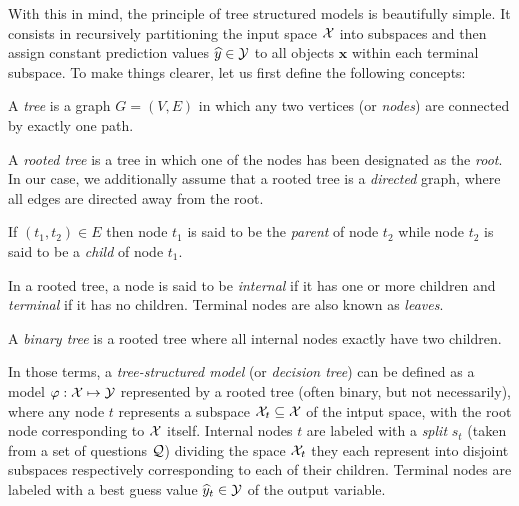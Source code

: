 With this in mind, the principle of tree structured models is beautifully
simple. It consists in recursively partitioning the input space ${\cal X}$ into
subspaces and then assign constant prediction values $\widehat{y}\in{\cal Y}$ to all objects
$\mathbf{x}$ within each terminal subspace. To make things clearer, let us first define
the following concepts:

\begin{definition}
A \emph{tree} is a graph $G=(V,E)$ in which any two vertices (or \emph{nodes})
are connected by exactly one path.
\end{definition}

\begin{definition}
A \emph{rooted tree} is a tree in which one of the nodes has been designated as
the \emph{root}. In our case, we additionally assume that a rooted tree is a
\emph{directed} graph, where all edges are directed away from the root.
\end{definition}

\begin{definition}
If $(t_1, t_2)\in E$ then node $t_1$ is said to be the \emph{parent} of
node $t_2$ while node $t_2$ is said to be a \emph{child} of node $t_1$.
\end{definition}

\begin{definition}
In a rooted tree, a node is said to be \emph{internal} if it has one or more
children and \emph{terminal} if it has no children. Terminal nodes are also
known as \emph{leaves}.
\end{definition}

\begin{definition}
A \emph{binary tree} is a rooted tree where all internal nodes exactly
have two children.
\end{definition}

In those terms, a \textit{tree-structured model} (or \textit{decision tree})
can be defined as a model $\varphi: {\cal X} \mapsto {\cal Y}$ represented by a
rooted tree (often binary, but not necessarily), where any node $t$ represents
a subspace ${\cal X}_t \subseteq {\cal X}$ of the intput space, with the root
node corresponding to ${\cal X}$ itself. Internal nodes $t$ are labeled with a
\textit{split} $s_t$ (taken from a set of questions ${\cal Q}$) dividing the space
${\cal X}_t$ they each represent into disjoint subspaces respectively corresponding to
each of their children. Terminal nodes are labeled with a best guess
value $\widehat{y}_t \in {\cal Y}$ of the output variable.



